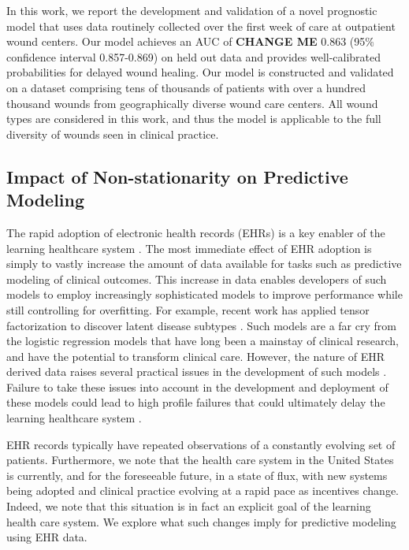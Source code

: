 In this work, we report the development and validation of a novel
prognostic model that uses data routinely collected over the first
week of care at outpatient wound centers.  Our model achieves an AUC
of \textbf{CHANGE ME} 0.863 (95\% confidence interval 0.857-0.869) on
held out data and provides well-calibrated probabilities for delayed
wound healing.  Our model is constructed and validated on a dataset
comprising tens of thousands of patients with over a hundred thousand
wounds from geographically diverse wound care centers.  All wound
types are considered in this work, and thus the model is applicable to
the full diversity of wounds seen in clinical practice.

\subsection{Impact of Non-stationarity on Predictive Modeling}
The rapid adoption of electronic health records (EHRs) is a key
enabler of the learning healthcare system
\cite{Friedman2010,Weng2012,Shah2012,Bates2014,Embi2013}.  The most
immediate effect of EHR adoption is simply to vastly increase the
amount of data available for tasks such as predictive modeling of
clinical outcomes.  This increase in data enables developers of such
models to employ increasingly sophisticated models to improve
performance while still controlling for overfitting.  For example,
recent work has applied tensor factorization to discover latent
disease subtypes \cite{Ho2014}.  Such models are a far cry from the
logistic regression models that have long been a mainstay of clinical
research, and have the potential to transform clinical care.  However,
the nature of EHR derived data raises several practical issues in the
development of such models \cite{Hersh2013,Hripcsak2011,Paxton2013}.
Failure to take these issues into account in the development and
deployment of these models could lead to high profile failures that
could ultimately delay the learning healthcare system
\cite{Cook2011,Boland2013}.

EHR records typically have repeated observations of a constantly
evolving set of patients.  Furthermore, we note that the health care
system in the United States is currently, and for the foreseeable
future, in a state of flux, with new systems being adopted and
clinical practice evolving at a rapid pace as incentives change.
Indeed, we note that this situation is in fact an explicit goal of the
learning health care system.  We explore what such changes imply for
predictive modeling using EHR data.

